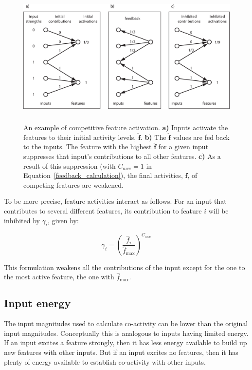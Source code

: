 \begin{figure}
\centering
\includegraphics[height=7cm]{figs/competitive_activation.eps}
\caption{An example of competitive feature activation. {\bf a)} Inputs activate the features to their initial activity levels, $\hat{\mathbf{f}}$. {\bf b)} The $\hat{\mathbf{f}}$ values are fed back to the inputs. The feature with the highest $\hat{\mathbf{f}}$ for a given input suppresses that input's contributions to all other features. {\bf c)} As a result of this suppression (with $C_{awe} = 1$ in Equation~\ref{feedback_calculation}), the final activities, $\mathbf{f}$, of competing features are weakened.}
\label{competitive_activation}
\end{figure}

To be more precise, feature activities interact as follows. For an input that contributes to several different features, its contribution to feature $i$ will be inhibited by $\gamma_i$, given by:

\begin{equation}
\gamma_i = \left( \frac{\hat{f}_i}{\hat{f}_{\max}}\right ) ^ {C_{awe}}
\label{feedback_calculation}
\end{equation}

This formulation weakens all the contributions of the input except for the one to the most active feature, the one with $\hat{f}_{\max}$.

\subsection{Input energy}

The input magnitudes used to calculate co-activity can be lower than the original input magnitudes. Conceptually this is analogous to inputs having limited energy. If an input excites a feature strongly, then it has less energy available to build up new features with other inputs. But if an input excites no features, then it has plenty of energy available to establish co-activity with other inputs.

